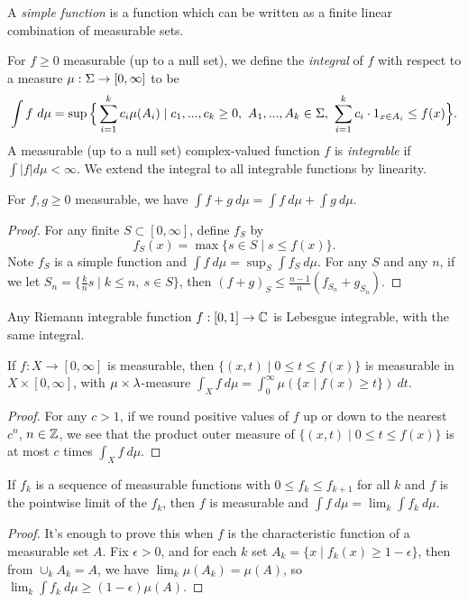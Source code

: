 \documentclass[letterpaper,11pt]{report}
\begin{document}
\begin{defn} A \emph{simple function} is a function which can be written as a finite linear combination of measurable sets.
\end{defn}

\begin{defn} For $f \ge 0$ measurable (up to a null set), we define the \emph{integral} of $f$ with respect to a measure $\mu:\Sigma\rightarrow [0,\infty]$ to be
\[
\int f\ d\mu = \sup\Big\{\sum_{i = 1}^k c_i\mu(A_i) \mid c_1, ..., c_k \ge 0,\ A_1, ..., A_k \in \Sigma,\ \sum_{i=1}^k c_i\cdot 1_{x \in A_i} \le f(x)\Big\}.
\]
A measurable (up to a null set) complex-valued function $f$ is \emph{integrable} if $\int |f| d\mu < \infty$. We extend the integral to all integrable functions by linearity.
\end{defn}

\begin{prop} For $f,g \ge 0$ measurable, we have $\int f+g\ d\mu = \int f\ d\mu + \int g\ d\mu$.
\end{prop}
\begin{proof} For any finite $S \subset [0,\infty]$, define $f_S$ by
\[
f_S(x) = \max \{s \in S \mid s \le f(x)\}.
\]
Note $f_S$ is a simple function and $\int f\ d\mu = \sup_S \int f_S\ d\mu$. For any $S$ and any $n$, if we let $S_n = \{\frac{k}{n}s\mid k \le n,\ s\in S\}$, then $(f+g)_S \le \frac{n-1}{n}(f_{S_n}+g_{S_n})$.
\end{proof}

\begin{prop} Any Riemann integrable function $f:[0,1] \rightarrow \mathbb{C}$ is Lebesgue integrable, with the same integral.
\end{prop}

\begin{prop} If $f:X \rightarrow [0,\infty]$ is measurable, then $\{(x,t) \mid 0 \le t \le f(x)\}$ is measurable in $X\times [0,\infty]$, with $\mu\times\lambda$-measure $\int_X f\ d\mu = \int_0^\infty \mu(\{x \mid f(x) \ge t\})\ dt$.
\end{prop}
\begin{proof} For any $c > 1$, if we round positive values of $f$ up or down to the nearest $c^n$, $n \in \mathbb{Z}$, we see that the product outer measure of $\{(x,t) \mid 0 \le t \le f(x)\}$ is at most $c$ times $\int_X f\ d\mu$.
\end{proof}

\begin{thm}\label{monotone-convergence} If $f_k$ is a sequence of measurable functions with $0 \le f_k \le f_{k+1}$ for all $k$ and $f$ is the pointwise limit of the $f_k$, then $f$ is measurable and $\int f\ d\mu = \lim_k \int f_k\ d\mu$.
\end{thm}
\begin{proof} It's enough to prove this when $f$ is the characteristic function of a measurable set $A$. Fix $\epsilon > 0$, and for each $k$ set $A_k = \{x \mid f_k(x) \ge 1-\epsilon\}$, then from $\cup_k A_k = A$, we have $\lim_k \mu(A_k) = \mu(A)$, so $\lim_k \int f_k\ d\mu \ge (1-\epsilon)\mu(A)$.
\end{proof}
\end{document}
